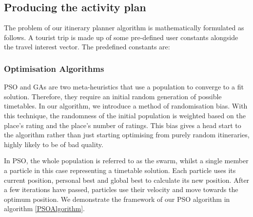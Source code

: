 

\subsection{Producing the activity plan}

The problem of our itinerary planner algorithm
is mathematically formulated as follows. A tourist trip is made up
of some pre-defined user constants alongside the travel interest
vector. The predefined constants are:
\\




\subsubsection{Optimisation Algorithms}

PSO and GAs are two meta-heuristics that use a population
to converge to a fit solution. Therefore, they require
an initial random generation of possible timetables. In
our algorithm, we introduce a method of randomisation
bias. With this technique, the randomness of the initial
population is weighted based on the place's rating and 
the place's number of ratings. This bias gives a 
head start to the algorithm rather than just starting 
optimising from purely random itineraries, highly likely 
to be of bad quality.

%



In PSO, the whole population is referred to as the
swarm, whilst a single member a particle in this case representing a timetable
solution. Each particle uses its current position, personal best and global best
to calculate its new position. After a few iterations have passed, particles use
their velocity and move towards the optimum position.
We demonstrate the framework of our PSO algorithm in
algorithm \ref{PSOAlgorithm}.



